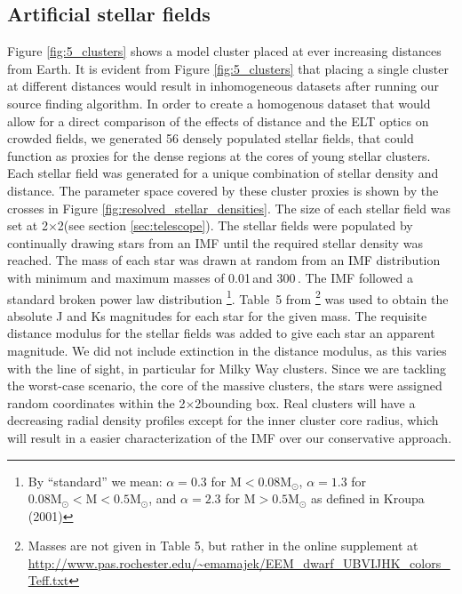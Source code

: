 \subsection{Artificial stellar fields}
Figure \ref{fig:5_clusters} shows a model cluster placed at ever increasing distances from Earth. 
It is evident from Figure \ref{fig:5_clusters} that placing a single cluster at different distances would result in inhomogeneous datasets after running our source finding algorithm. 
In order to create a homogenous dataset that would allow for a direct comparison of the effects of distance and the ELT optics on crowded fields, we generated 56 densely populated stellar fields, that could function as proxies for the dense regions at the cores of young stellar clusters. 
Each stellar field was generated for a unique combination of stellar density and distance.
The parameter space covered by these cluster proxies is shown by the crosses in Figure \ref{fig:resolved_stellar_densities}. 
The size of each stellar field was set at 2\arcsec$\times$2\arcsec (see section \ref{sec:telescope}). 
The stellar fields were populated by continually drawing stars from an IMF until the required stellar density was reached. 
The mass of each star was drawn at random from an IMF distribution with minimum and maximum masses of 0.01\,\msun and 300\,\msun. 
The IMF followed a standard \citet{kroupa2001} broken power law distribution%
\footnote{By ``standard'' we mean: $\alpha=0.3$ for $\mathrm{M} < 0.08 \mathrm{M}_\odot$, $\alpha=1.3$ for $0.08\mathrm{M}_\odot < \mathrm{M} < 0.5 \mathrm{M}_\odot$, and $\alpha=2.3$ for $\mathrm{M} > 0.5 \mathrm{M}_\odot$ as defined in Kroupa (2001)}. 
Table~5 from \citet{pecaut2013}\footnote{Masses are not given in Table 5, but rather in the online supplement at \url{http://www.pas.rochester.edu/~emamajek/EEM_dwarf_UBVIJHK_colors_Teff.txt}}
was used to obtain the absolute J and Ks magnitudes for each star for the given mass. 
The requisite distance modulus for the stellar fields was added to give each star an apparent magnitude. 
We did not include extinction in the distance modulus, as this varies with the line of sight, in particular for Milky Way clusters. 
Since we are tackling the worst-case scenario, the core of the massive clusters, the stars were assigned random coordinates within the 2\arcsec$\times$2\arcsec bounding box. Real clusters will have a decreasing radial density profiles except for the inner cluster core radius, which will result in a easier characterization of the IMF over our conservative approach.

